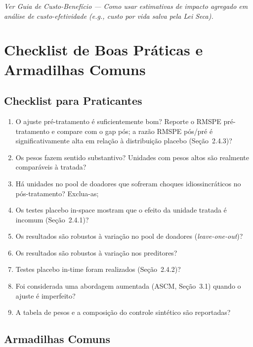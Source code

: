 \documentclass[12pt, a4paper, openany]{book}
\begin{document}
\begin{conexaobox}
\textit{Ver Guia de Custo-Benefício --- Como usar estimativas de impacto agregado em análise de custo-efetividade (e.g., custo por vida salva pela Lei Seca).}
\end{conexaobox}


\newpage
\chapter{Checklist de Boas Práticas e Armadilhas Comuns}

\section{Checklist para Praticantes}

\begin{enumerate}[leftmargin=1.5cm]
  \item O ajuste pré-tratamento é suficientemente bom? Reporte o RMSPE pré-tratamento e compare com o gap pós; a razão RMSPE pós/pré é significativamente alta em relação à distribuição placebo (Seção~2.4.3)?
  \item Os pesos fazem sentido substantivo? Unidades com pesos altos são realmente comparáveis à tratada?
  \item Há unidades no pool de doadores que sofreram choques idiossincráticos no pós-tratamento? Exclua-as;
  \item Os testes placebo in-space mostram que o efeito da unidade tratada é incomum (Seção~2.4.1)?
  \item Os resultados são robustos à variação no pool de doadores (\textit{leave-one-out})?
  \item Os resultados são robustos à variação nos preditores?
  \item Testes placebo in-time foram realizados (Seção~2.4.2)?
  \item Foi considerada uma abordagem aumentada (ASCM, Seção~3.1) quando o ajuste é imperfeito?
  \item A tabela de pesos e a composição do controle sintético são reportadas?
\end{enumerate}

\section{Armadilhas Comuns}
\end{document}
